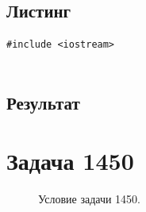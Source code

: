\documentclass[a5paper, 10pt]{article}
\theoremstyle{definition}
\theoremstyle{plain}
\theoremstyle{remark}
\begin{document}
\subsection{Листинг}

\begin{center}
\begin{lstlisting}[label=some-code,caption={Исходный код для 1650}]
#include <iostream>


\end{lstlisting}
\end{center}

\subsection{Результат}







\newpage
\section{Задача 1450}

\begin{figure}[h!]
\caption{Условие задачи 1450.}
\end{figure}
\end{document}
